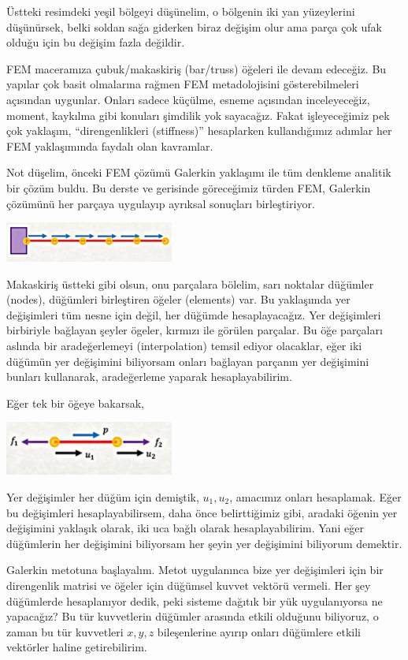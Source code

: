 \documentclass[12pt,fleqn]{article}\usepackage{../../common}
\begin{document}
Üstteki resimdeki yeşil bölgeyi düşünelim, o bölgenin iki yan yüzeylerini
düşünürsek, belki soldan sağa giderken biraz değişim olur ama parça çok ufak
olduğu için bu değişim fazla değildir. 

FEM maceramıza çubuk/makaskiriş (bar/truss) öğeleri ile devam edeceğiz.  Bu
yapılar çok basit olmalarına rağmen FEM metadolojisini gösterebilmeleri
açısından uygunlar. Onları sadece küçülme, esneme açısından inceleyeceğiz,
moment, kaykılma gibi konuları şimdilik yok sayacağız. Fakat işleyeceğimiz pek
çok yaklaşım, ``direngenlikleri (stiffness)'' hesaplarken kullandığımız adımlar
her FEM yaklaşımında faydalı olan kavramlar.

Not düşelim, önceki FEM çözümü Galerkin yaklaşımı ile tüm denkleme analitik bir
çözüm buldu. Bu derste ve gerisinde göreceğimiz türden FEM, Galerkin çözümünü
her parçaya uygulayıp ayrıksal sonuçları birleştiriyor.

\includegraphics[width=15em]{compscieng_bpp45fem2_03.jpg}

Makaskiriş üstteki gibi olsun, onu parçalara bölelim, sarı noktalar düğümler
(nodes), düğümleri birleştiren öğeler (elements) var. Bu yaklaşımda yer
değişimleri tüm nesne için değil, her düğümde hesaplayacağız. Yer değişimleri
birbiriyle bağlayan şeyler ögeler, kırmızı ile görülen parçalar.  Bu öğe
parçaları aslında bir aradeğerlemeyi (interpolation) temsil ediyor olacaklar,
eğer iki düğümün yer değişimini biliyorsam onları bağlayan parçanın yer
değişimini bunları kullanarak, aradeğerleme yaparak hesaplayabilirim.

Eğer tek bir öğeye bakarsak,

\includegraphics[width=15em]{compscieng_bpp45fem2_04.jpg}

Yer değişimler her düğüm için demiştik, $u_1,u_2$, amacımız onları hesaplamak.
Eğer bu değişimleri hesaplayabilirsem, daha önce belirttiğimiz gibi, aradaki
öğenin yer değişimini yaklaşık olarak, iki uca bağlı olarak hesaplayabilirim.
Yani eğer düğümlerin her değişimini biliyorsam her şeyin yer değişimini
biliyorum demektir.

Galerkin metotuna başlayalım. Metot uygulanınca bize yer değişimleri için bir
direngenlik matrisi ve öğeler için düğümsel kuvvet vektörü vermeli. Her şey
düğümlerde hesaplanıyor dedik, peki sisteme dağıtık bir yük uygulanıyorsa
ne yapacağız? Bu tür kuvvetlerin düğümler arasında etkili olduğunu biliyoruz,
o zaman bu tür kuvvetleri $x,y,z$ bileşenlerine ayırıp onları düğümlere etkili
vektörler haline getirebilirim.
\end{document}
